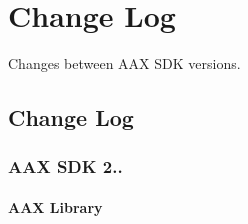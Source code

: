 \hypertarget{a00375}{}\section{Change Log}
\label{a00375}
Changes between A\+A\+X S\+D\+K versions. 

\hypertarget{a00375_changelog}{}\subsection{Change Log}\label{a00375_changelog}
\hypertarget{a00375_aax_sdk_2p3p1}{}\subsubsection{A\+A\+X S\+D\+K 2..}\label{a00375_aax_sdk_2p3p1}
\hypertarget{a00375_aax_sdk_2p3p1_AAXLibrary}{}\paragraph{A\+A\+X Library}\label{a00375_aax_sdk_2p3p1_AAXLibrary}

